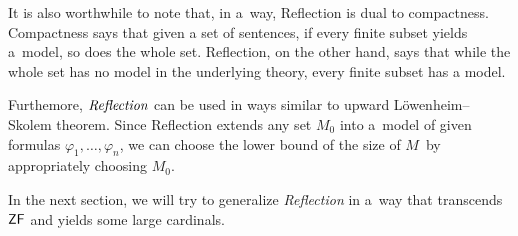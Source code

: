It is also worthwhile to note that, in a~way, Reflection is dual to compactness. 
Compactness says that given a set of sentences, if every finite subset yields a~model, so does the whole set. Reflection, on the other hand, says that while the whole set has no model in the underlying theory, every finite subset has a model.

Furthemore, $\emph{Reflection}$ can be used in ways similar to upward Löwenheim–Skolem theorem.
Since Reflection extends any set $M_0$ into a~model of given formulas $\varphi_1, \ldots, \varphi_n$, we can choose the lower bound of the size of $M$ by appropriately choosing $M_0$.

In the next section, we will try to generalize \emph{Reflection} in a~way that transcends $\sf{ZF}$ and yields some large cardinals.
\newpage
